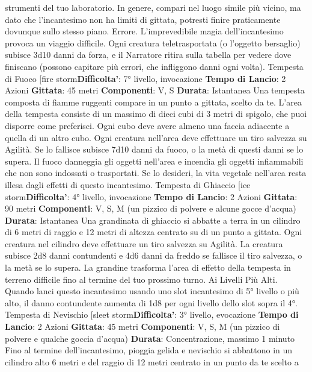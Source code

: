 \begin{multicols}{2}
strumenti del tuo laboratorio. In genere, compari nel
luogo simile più vicino, ma dato che l’incantesimo non
ha limiti di gittata, potresti finire praticamente dovunque
sullo stesso piano.
Errore. L’imprevedibile magia dell’incantesimo provoca
un viaggio difficile. Ogni creatura teletrasportata (o
l’oggetto bersaglio) subisce 3d10 danni da forza, e il
Narratore ritira sulla tabella per vedere dove finiscano
(possono capitare più errori, che infliggono danni ogni
volta).
Tempesta di Fuoco
[fire storm\textbf{Difficolta'}:
7° livello, invocazione
\textbf{Tempo di Lancio}: 2 Azioni
\textbf{Gittata}: 45 metri
\textbf{Componenti}: V, S
\textbf{Durata}: Istantanea
Una tempesta composta di fiamme ruggenti compare in
un punto a gittata, scelto da te. L’area della tempesta
consiste di un massimo di dieci cubi di 3 metri di
spigolo, che puoi disporre come preferisci. Ogni cubo
deve avere almeno una faccia adiacente a quella di un
altro cubo. Ogni creatura nell’area deve effettuare un
tiro salvezza su Agilità. Se lo fallisce subisce 7d10
danni da fuoco, o la metà di questi danni se lo supera.
Il fuoco danneggia gli oggetti nell’area e incendia gli
oggetti infiammabili che non sono indossati o
trasportati. Se lo desideri, la vita vegetale nell’area
resta illesa dagli effetti di questo incantesimo.
Tempesta di Ghiaccio
[ice storm\textbf{Difficolta'}:
4° livello, invocazione
\textbf{Tempo di Lancio}: 2 Azioni
\textbf{Gittata}: 90 metri
\textbf{Componenti}: V, S, M (un pizzico di polvere e alcune
gocce d’acqua)
\textbf{Durata}: Istantanea
Una grandinata di ghiaccio si abbatte a terra in un
cilindro di 6 metri di raggio e 12 metri di altezza centrato
su di un punto a gittata. Ogni creatura nel cilindro deve
effettuare un tiro salvezza su Agilità. La creatura
subisce 2d8 danni contundenti e 4d6 danni da freddo
se fallisce il tiro salvezza, o la metà se lo supera.
La grandine trasforma l’area di effetto della tempesta in
terreno difficile fino al termine del tuo prossimo turno.
Ai Livelli Più Alti. Quando lanci questo incantesimo
usando uno slot incantesimo di 5° livello o più alto, il
danno contundente aumenta di 1d8 per ogni livello dello
slot sopra il 4°.
Tempesta di Nevischio
[sleet storm\textbf{Difficolta'}:
3° livello, evocazione
\textbf{Tempo di Lancio}: 2 Azioni
\textbf{Gittata}: 45 metri
\textbf{Componenti}: V, S, M (un pizzico di polvere e qualche
goccia d’acqua)
\textbf{Durata}: Concentrazione, massimo 1 minuto
Fino al termine dell’incantesimo, pioggia gelida e
nevischio si abbattono in un cilindro alto 6 metri e del
raggio di 12 metri centrato in un punto da te scelto a

\end{multicols}
